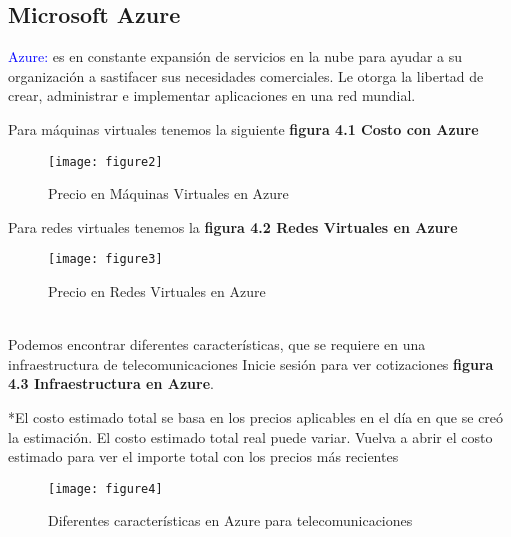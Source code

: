 \subsection{Microsoft Azure}

\textcolor{blue}{Azure:} es en constante expansión de servicios en la nube para ayudar a su organización a sastifacer sus necesidades comerciales. Le otorga la libertad de crear, administrar e implementar aplicaciones en una red mundial.

Para máquinas virtuales tenemos la siguiente \textbf{figura 4.1 Costo con Azure}

\begin{figure}[htbp]
  \centering
    {\texttt{[image: figure2]}}%
  \caption{Precio en Máquinas Virtuales en Azure}
  \label{fig:fig2subfig}
\end{figure}
Para redes virtuales tenemos la \textbf{figura 4.2 Redes Virtuales en Azure}
\begin{figure}[htbp]
  \centering
    {\texttt{[image: figure3]}}%
  \caption{Precio en Redes Virtuales en Azure}
  \label{fig:fig2subfig}
\end{figure}
%
\\
Podemos encontrar diferentes características, que se requiere en una infraestructura de telecomunicaciones 
Inicie sesión para ver cotizaciones  \textbf{figura 4.3 Infraestructura en Azure}.

*El costo estimado total se basa en los precios aplicables en el día en que se creó la estimación. El costo estimado total real puede variar. Vuelva a abrir el costo estimado para ver el importe total con los precios más recientes
\\
\begin{figure}[htbp]
  \centering
    {\texttt{[image: figure4]}}%
  \caption{Diferentes características en Azure para telecomunicaciones}
  \label{fig:fig2subfig}
\end{figure}

